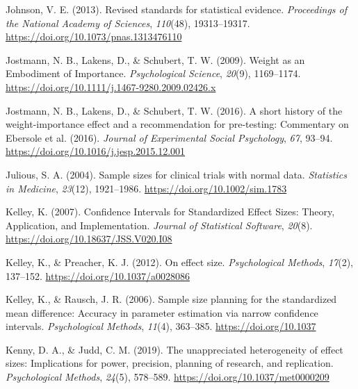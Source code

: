 \documentclass[
  letterpaper,
  DIV=11,
  numbers=noendperiod]{scrreprt}
\newlength{\cslhangindent}
\newlength{\cslentryspacingunit} %
\newenvironment{CSLReferences}[2] %
 {%
  \setlength{\parindent}{0pt}
  \ifodd #1
  \let\oldpar\par
  \def\par{\hangindent=\cslhangindent\oldpar}
  \fi
  \setlength{\parskip}{#2\cslentryspacingunit}
 }%
 {}
\begin{document}
\begin{CSLReferences}{1}{0}
\leavevmode{}%
Johnson, V. E. (2013). Revised standards for statistical evidence.
\emph{Proceedings of the National Academy of Sciences}, \emph{110}(48),
19313--19317. \url{https://doi.org/10.1073/pnas.1313476110}

\leavevmode{}%
Jostmann, N. B., Lakens, D., \& Schubert, T. W. (2009). Weight as an
{Embodiment} of {Importance}. \emph{Psychological Science},
\emph{20}(9), 1169--1174.
\url{https://doi.org/10.1111/j.1467-9280.2009.02426.x}

\leavevmode{}%
Jostmann, N. B., Lakens, D., \& Schubert, T. W. (2016). A short history
of the weight-importance effect and a recommendation for pre-testing:
{Commentary} on {Ebersole} et al. (2016). \emph{Journal of Experimental
Social Psychology}, \emph{67}, 93--94.
\url{https://doi.org/10.1016/j.jesp.2015.12.001}

\leavevmode{}%
Julious, S. A. (2004). Sample sizes for clinical trials with normal
data. \emph{Statistics in Medicine}, \emph{23}(12), 1921--1986.
\url{https://doi.org/10.1002/sim.1783}

\leavevmode{}%
Kelley, K. (2007). Confidence {Intervals} for {Standardized Effect
Sizes}: {Theory}, {Application}, and {Implementation}. \emph{Journal of
Statistical Software}, \emph{20}(8).
\url{https://doi.org/10.18637/JSS.V020.I08}

\leavevmode{}%
Kelley, K., \& Preacher, K. J. (2012). On effect size.
\emph{Psychological Methods}, \emph{17}(2), 137--152.
\url{https://doi.org/10.1037/a0028086}

\leavevmode{}%
Kelley, K., \& Rausch, J. R. (2006). Sample size planning for the
standardized mean difference: Accuracy in parameter estimation via
narrow confidence intervals. \emph{Psychological Methods}, \emph{11}(4),
363--385. \url{https://doi.org/10.1037}

\leavevmode{}%
Kenny, D. A., \& Judd, C. M. (2019). The unappreciated heterogeneity of
effect sizes: {Implications} for power, precision, planning of research,
and replication. \emph{Psychological Methods}, \emph{24}(5), 578--589.
\url{https://doi.org/10.1037/met0000209}


\end{CSLReferences}
\end{document}

